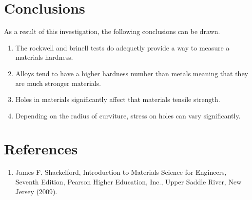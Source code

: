 \documentclass{article}
\begin{document}
\section{Conclusions}
As a result of this investigation, the following conclusions can be drawn.
\begin{enumerate}
\item The rockwell and brinell tests do adequetly provide a way to measure a materials hardness.
\item Alloys tend to have a higher hardness number than metals meaning that they are much stronger materials.
\item Holes in materials significantly affect that materials tensile strength.
\item Depending on the radius of curviture, stress on holes can vary significantly.
\end{enumerate}


\section{References}
\begin{enumerate}
\item James F. Shackelford, Introduction to Materials Science for Engineers, Seventh Edition, Pearson Higher 
Education, Inc., Upper Saddle River, New Jersey (2009).
\end{enumerate}








\end{document}
